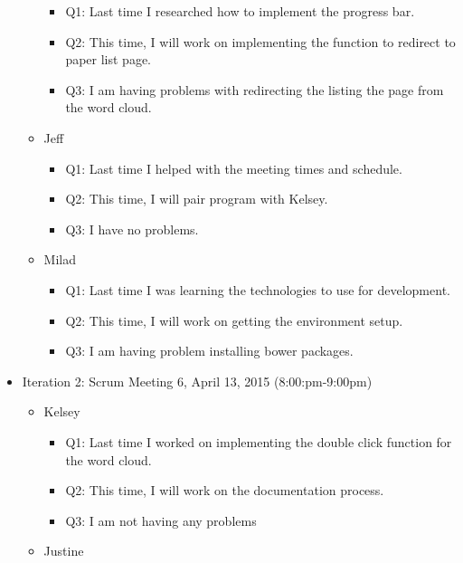 \documentclass[]{article}
\begin{document}
\begin{itemize}
\begin{itemize}
    \begin{itemize}
    \itemsep1pt\parskip0pt
    \item
      Q1: Last time I researched how to implement the progress bar.
    \item
      Q2: This time, I will work on implementing the function to
      redirect to paper list page.
    \item
      Q3: I am having problems with redirecting the listing the page
      from the word cloud.
    \end{itemize}
  \item
    Jeff

    \begin{itemize}
    \itemsep1pt\parskip0pt
    \item
      Q1: Last time I helped with the meeting times and schedule.
    \item
      Q2: This time, I will pair program with Kelsey.
    \item
      Q3: I have no problems.
    \end{itemize}
  \item
    Milad

    \begin{itemize}
    \itemsep1pt\parskip0pt
    \item
      Q1: Last time I was learning the technologies to use for
      development.
    \item
      Q2: This time, I will work on getting the environment setup.
    \item
      Q3: I am having problem installing bower packages.
    \end{itemize}
  \end{itemize}
\item
  Iteration 2: Scrum Meeting 6, April 13, 2015 (8:00:pm-9:00pm)

  \begin{itemize}
  \itemsep1pt\parskip0pt
  \item
    Kelsey

    \begin{itemize}
    \itemsep1pt\parskip0pt
    \item
      Q1: Last time I worked on implementing the double click function
      for the word cloud.
    \item
      Q2: This time, I will work on the documentation process.
    \item
      Q3: I am not having any problems
    \end{itemize}
  \item
    Justine


\end{itemize}
\end{itemize}
\end{document}
